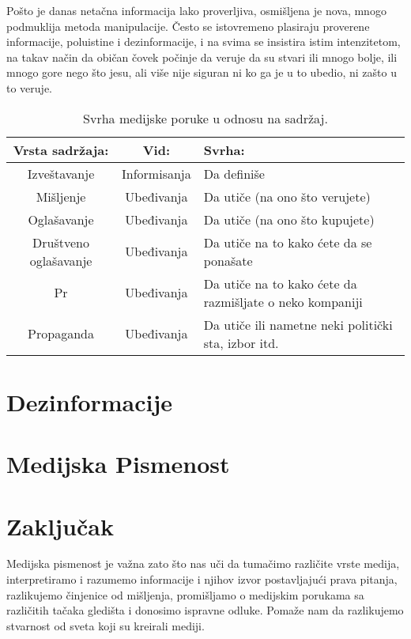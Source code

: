 \documentclass[a4paper]{article}
\begin{document}
Pošto je danas netačna informacija lako proverljiva, osmišljena je nova, mnogo podmuklija metoda manipulacije. Često se istovremeno plasiraju proverene informacije, poluistine i  dezinformacije, i na svima se insistira istim intenzitetom, na takav način da običan čovek počinje da veruje da su stvari ili mnogo bolje, ili mnogo gore nego što jesu, ali više nije siguran ni ko ga je u to ubedio, ni zašto u to veruje.

\begin{table}[h!]
\begin{center}
\caption{ Svrha medijske poruke u odnosu na sadržaj.}
\begin{tabular}{|c|c|p{3cm} |} \hline
Vrsta sadržaja:& Vid:& Svrha:\\ \hline
Izveštavanje&Informisanja&Da definiše\\ \hline
Mišljenje &Ubeđivanja&Da utiče (na ono što verujete)\\ \hline
Oglašavanje &Ubeđivanja&Da utiče (na ono što kupujete)\\ \hline
Društveno oglašavanje &Ubeđivanja&Da utiče na to kako ćete da se ponašate\\ \hline
Pr &Ubeđivanja&Da utiče na to kako ćete da razmišljate o neko kompaniji\\ \hline
Propaganda &Ubeđivanja&Da utiče ili nametne neki politički sta, izbor itd.\\ \hline
\end{tabular}
\label{tab:tabela1}
\end{center}
\end{table}


\section{Dezinformacije}

\section{Medijska Pismenost}





\section{Zaključak}
\label{sec:zakljucak}

Medijska pismenost je važna zato što nas uči da tumačimo različite vrste medija, interpretiramo i razumemo informacije i njihov izvor postavljajući prava pitanja, razlikujemo činjenice od mišljenja, promišljamo o medijskim porukama sa različitih tačaka gledišta i donosimo ispravne odluke. Pomaže nam da razlikujemo stvarnost od sveta koji su kreirali mediji. 
\end{document}
